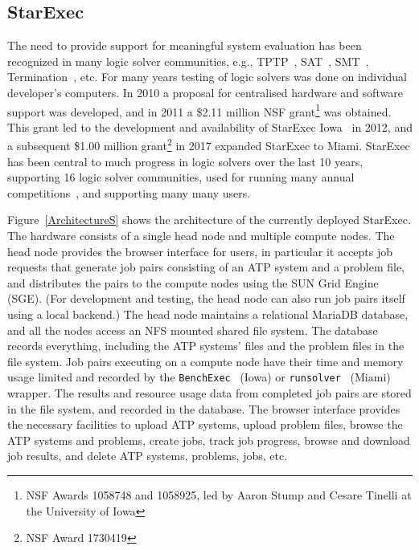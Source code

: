 \documentclass{easychair}
\begin{document}
\subsection{StarExec}
\label{StarExec}

The need to provide support for meaningful system evaluation has been recognized in many logic 
solver communities, e.g., TPTP~\cite{SS01}, SAT~\cite{HS00-SATLIB}, SMT~\cite{CSW15},
Termination~\cite{MZ07}, etc.
For many years testing of logic solvers was done on individual developer's computers. 
In 2010 a proposal for centralised hardware and software support was developed,
and in 2011 a \$2.11 million NSF grant\footnote{%
NSF Awards 1058748 and 1058925, led by Aaron Stump and Cesare Tinelli at the University of Iowa} 
was obtained.
This grant led to the development and availability of StarExec Iowa~\cite{SST14} in 2012,
and a subsequent \$1.00 million grant\footnote{%
NSF Award 1730419} in 2017 expanded StarExec to Miami.
StarExec has been central to much progress in logic solvers over the last 10 years, supporting
16 logic solver communities, used for running many annual competitions~\cite{BB+19}, and 
supporting many many users.

Figure~\ref{ArchitectureS} shows the architecture of the currently deployed StarExec.
The hardware consists of a single head node and multiple compute nodes.
The head node provides the browser interface for users, in particular it accepts job requests
that generate job pairs consisting of an ATP system and a problem file, and distributes the
pairs to the compute nodes using the SUN Grid Engine (SGE).
(For development and testing, the head node can also run job pairs itself using a local backend.)
The head node maintains a relational MariaDB database, and all the nodes access an NFS mounted
shared file system.
The database records everything, including the ATP systems' files and the problem files in the 
file system.
Job pairs executing on a compute node have their time and memory usage limited and recorded
by the {\tt BenchExec}~\cite{} (Iowa) or {\tt runsolver}~\cite{} (Miami) wrapper.
The results and resource usage data from completed job pairs are stored in the file system, 
and recorded in the database.
The browser interface provides the necessary facilities to upload ATP systems, upload problem
files, browse the ATP systems and problems, create jobs, track job progress, browse and download
job results, and delete ATP systems, problems, jobs, etc.
\end{document}
